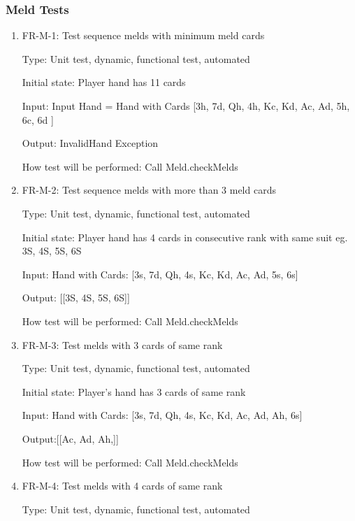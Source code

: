 \documentclass[12pt, titlepage]{article}
\begin{document}
\subsubsection{Meld Tests}
\begin{enumerate}
    \item{FR-M-1: Test sequence melds with minimum meld cards\\}
    
    Type: Unit test, dynamic, functional test, automated
    
    Initial state: Player hand has 11 cards
    
    Input: Input Hand = Hand with Cards [3h, 7d, Qh, 4h, Kc, Kd, Ac, Ad, 5h, 6c, 6d ]
    
    Output: InvalidHand Exception
    
    How test will be performed: Call Meld.checkMelds
    
    \item{FR-M-2: Test sequence melds with more than 3 meld cards\\}
    
    Type: Unit test, dynamic, functional test, automated
    
    Initial state: Player hand has 4 cards in consecutive rank with same suit eg. 3S, 4S, 5S, 6S
    
    Input: Hand with Cards: [3s, 7d, Qh, 4s, Kc, Kd, Ac, Ad, 5s, 6s]
    
    Output: [[3S, 4S, 5S, 6S]] 
    
    How test will be performed: Call Meld.checkMelds
    
    \item{FR-M-3: Test melds with 3 cards of same rank\\}
    
    Type: Unit test, dynamic, functional test, automated 
    
    Initial state: Player's hand has 3 cards of same rank
    
    Input: Hand with Cards: [3s, 7d, Qh, 4s, Kc, Kd, Ac, Ad, Ah, 6s]
    
    Output:[[Ac, Ad, Ah,]]
    
    How test will be performed: Call Meld.checkMelds
    
    \item{FR-M-4: Test melds with 4 cards of same rank\\}
    
    Type: Unit test, dynamic, functional test, automated
    

\end{enumerate}
\end{document}
